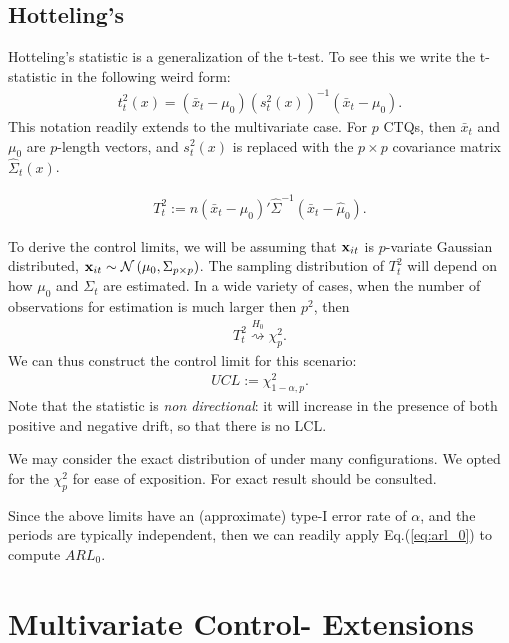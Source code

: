\subsection{Hotteling's \tsq}
Hotteling's \tsq statistic is a generalization of the t-test.
To see this we write the t-statistic in the following weird form:
\begin{align}
	t^2_t(x)=(\bar{x}_t-\mu_0) (s^2_t(x))^{-1} (\bar{x}_t-\mu_0).
\end{align}
This notation readily extends to the multivariate case. 
For $p$ CTQs, then $\bar{x}_t$ and $\mu_0$ are $p$-length vectors, and $s^2_t(x)$ is replaced with the $p \times p$ covariance matrix $\hat{\Sigma}_t(x)$.
\begin{definition}
\begin{align}
\label{eq:hotteling}
	T^2_t := n (\bar{x}_t-\hat{\mu}_0)' \hat{\Sigma}^{-1} (\bar{x}_t-\hat{\mu}_0).
\end{align}
\end{definition}
To derive the control limits, we will be assuming that $\mathbf{x}_{it}$ is $p$-variate Gaussian distributed, $\mathbf{x}_{it}\sim \mathcal{N}\left(\mu_0, \Sigma_{p \times p}\right)$. 
The sampling distribution of $T^2_t$ will depend on how $\mu_0$ and $\Sigma_t$ are estimated. 
In a wide variety of cases, when the number of observations for estimation is much larger then $p^2$, then 
\begin{align}
	T^2_t \overset{H_0}{\rightsquigarrow }\chi^2_p.
\end{align}
We can thus construct the control limit for this scenario:
\begin{align}
	UCL:= \chi^2_{1-\alpha,p}.
\end{align}
Note that the \tsq statistic is \emph{non directional}: it will increase in the presence of both positive and negative drift, so that there is no LCL.

We may consider the exact distribution of \tsq under many configurations. 
We opted for the $\chi^2_p$ for ease of exposition. For exact result \cite[Ch.7]{qiu_introduction_2013} should be consulted. 

Since the above limits have an (approximate) type-I error rate of $\alpha$, and the periods are typically independent, then we can readily apply Eq.(\ref{eq:arl_0}) to compute $ARL_0$.



\section[Multivariate extensions]{Multivariate Control- Extensions}

